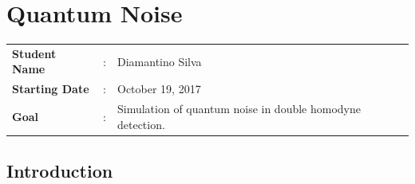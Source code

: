 \clearpage
\section{Quantum Noise}

\begin{tcolorbox}	
\begin{tabular}{p{2.75cm} p{0.2cm} p{10.5cm}}
\textbf{Student Name}  &:& Diamantino Silva\\
\textbf{Starting Date} &:& October 19, 2017\\
\textbf{Goal}          &:& Simulation of quantum noise in double homodyne detection.
\end{tabular}
\end{tcolorbox}


\subsection*{Introduction}\label{sec:intro}


